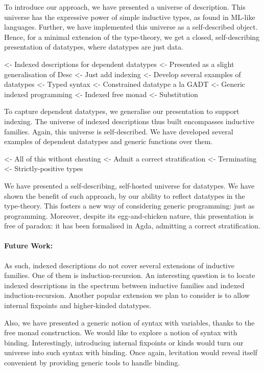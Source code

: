 \documentclass[preprint
              , authoryear
              ]{sigplanconf}
\newenvironment{wstructure}{\comment}{\endcomment}
\begin{document}
To introduce our approach, we have presented a universe of
description. This universe has the expressive power of simple
inductive types, as found in ML-like languages. Further, we have
implemented this universe as a self-described object. Hence, for a
minimal extension of the type-theory, we get a closed, self-describing
presentation of datatypes, where datatypes are just data.

\begin{wstructure}
<- Indexed descriptions for dependent datatypes
    <- Presented as a slight generalisation of Desc
        <- Just add indexing
    <- Develop several examples of datatypes
        <- Typed syntax
        <- Constrained datatype a la GADT
    <- Generic indexed programming
        <- Indexed free monad
        <- Substitution
\end{wstructure}

To capture dependent datatypes, we generalise our presentation to
support indexing. The universe of indexed descriptions thus built
encompasses inductive families. Again, this universe is
self-described. We have developed several examples of dependent
datatypes and generic functions over them.

\begin{wstructure}
<- All of this without cheating
    <- Admit a correct stratification
    <- Terminating
    <- Strictly-positive types
\end{wstructure}

We have presented a self-describing, self-hosted universe for
datatypes. We have shown the benefit of such approach, by our ability
to reflect datatypes in the type-theory. This fosters a new way of
considering generic programming: just as programming. Moreover,
despite its egg-and-chicken nature, this presentation is free of
paradox: it has been formalised in Agda, admitting a correct
stratification.

\paragraph{Future Work:} As such, indexed descriptions do
not cover several extensions of inductive families. One of them is
induction-recursion. An interesting question is to locate indexed
descriptions in the spectrum between inductive families and indexed
induction-recursion. Another popular extension we plan to consider is
to allow internal fixpoints and higher-kinded datatypes.

Also, we have presented a generic notion of syntax with variables,
thanks to the free monad construction. We would like to explore a
notion of syntax with binding. Interestingly, introducing internal
fixpoints or kinds would turn our universe into such syntax with
binding. Once again, levitation would reveal itself convenient by
providing generic tools to handle binding.
\end{document}
